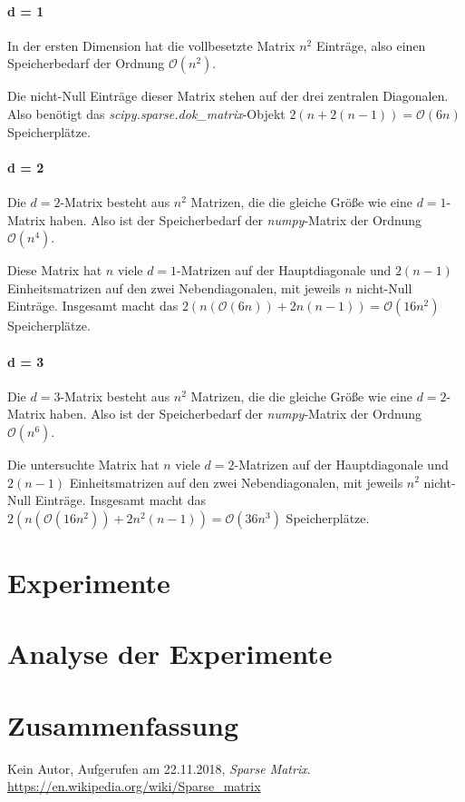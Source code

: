 \documentclass[smallheadings]{scrartcl}
\begin{document}
\paragraph{d = 1}
In der ersten Dimension hat die vollbesetzte Matrix $n^2$ Einträge, also einen Speicherbedarf der Ordnung $\mathcal{O}(n^2)$.

Die nicht-Null Einträge dieser Matrix stehen auf der drei zentralen Diagonalen. Also benötigt das \textit{scipy.sparse.dok\_matrix}-Objekt $2(n+2(n-1)) = \mathcal{O}(6n)$ Speicherplätze.

\paragraph{d = 2}
Die $d=2$-Matrix besteht aus $n^2$ Matrizen, die die gleiche Größe wie eine $d=1$-Matrix haben. Also ist der Speicherbedarf der \textit{numpy}-Matrix der Ordnung $\mathcal{O}(n^4)$.

 Diese Matrix hat $n$ viele $d=1$-Matrizen auf der Hauptdiagonale  und $2(n-1)$ Einheitsmatrizen auf den zwei Nebendiagonalen, mit jeweils $n$ nicht-Null Einträge. Insgesamt macht das $2(n(\mathcal{O}(6n))+2n(n-1))=\mathcal{O}(16n^2)$ Speicherplätze.
 
 \paragraph{d = 3}
 Die $d=3$-Matrix besteht aus $n^2$ Matrizen, die die gleiche Größe wie eine $d=2$-Matrix haben. Also ist der Speicherbedarf der \textit{numpy}-Matrix der Ordnung $\mathcal{O}(n^6)$.
 
 Die untersuchte Matrix hat $n$ viele $d=2$-Matrizen auf der Hauptdiagonale  und $2(n-1)$ Einheitsmatrizen auf den zwei Nebendiagonalen, mit jeweils $n^2$ nicht-Null Einträge. Insgesamt macht das $2(n(\mathcal{O}(16n^2))+2n^2(n-1))=\mathcal{O}(36n^3)$ Speicherplätze.

\section{Experimente}



\section{Analyse der Experimente}



\section{Zusammenfassung}




\begin{thebibliography}{9}
 Kein Autor, Aufgerufen am 22.11.2018, \textit{Sparse Matrix}. 
\url{https://en.wikipedia.org/wiki/Sparse_matrix}
\end{thebibliography}


\end{document}
